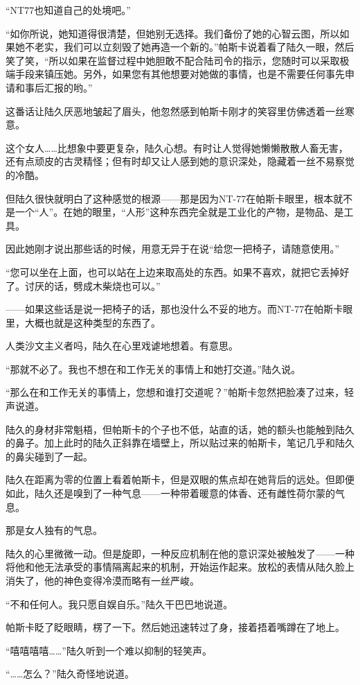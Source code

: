 “NT77也知道自己的处境吧。”

“如你所说，她知道得很清楚，但她别无选择。我们备份了她的心智云图，所以如果她不老实，我们可以立刻毁了她再造一个新的。”帕斯卡说着看了陆久一眼，然后笑了笑，“所以如果在监督过程中她胆敢不配合陆司令的指示，您随时可以采取极端手段来镇压她。另外，如果您有其他想要对她做的事情，也是不需要任何事先申请和事后汇报的哟。”

这番话让陆久厌恶地皱起了眉头，他忽然感到帕斯卡刚才的笑容里仿佛透着一丝寒意。

这个女人……比想象中要更复杂，陆久心想。有时让人觉得她懒懒散散人畜无害，还有点顽皮的古灵精怪；但有时却又让人感到她的意识深处，隐藏着一丝不易察觉的冷酷。

但陆久很快就明白了这种感觉的根源——那是因为NT-77在帕斯卡眼里，根本就不是一个“人”。在她的眼里，“人形”这种东西完全就是工业化的产物，是物品、是工具。

因此她刚才说出那些话的时候，用意无异于在说“给您一把椅子，请随意使用。”

“您可以坐在上面，也可以站在上边来取高处的东西。如果不喜欢，就把它丢掉好了。讨厌的话，劈成木柴烧也可以。”

——如果这些话是说一把椅子的话，那也没什么不妥的地方。而NT-77在帕斯卡眼里，大概也就是这种类型的东西了。

人类沙文主义者吗，陆久在心里戏谑地想着。有意思。

“那就不必了。我也不想在和工作无关的事情上和她打交道。”陆久说。

“那么在和工作无关的事情上，您想和谁打交道呢？”帕斯卡忽然把脸凑了过来，轻声说道。

陆久的身材非常魁梧，但帕斯卡的个子也不低，站直的话，她的额头也能触到陆久的鼻子。加上此时的陆久正斜靠在墙壁上，所以贴过来的帕斯卡，笔记几乎和陆久的鼻尖碰到了一起。

陆久在距离为零的位置上看着帕斯卡，但是双眼的焦点却在她背后的远处。但即便如此，陆久还是嗅到了一种气息——一种带着暖意的体香、还有雌性荷尔蒙的气息。

那是女人独有的气息。

陆久的心里微微一动。但是旋即，一种反应机制在他的意识深处被触发了——一种将他和他无法承受的事情隔离起来的机制，开始运作起来。放松的表情从陆久脸上消失了，他的神色变得冷漠而略有一丝严峻。

“不和任何人。我只愿自娱自乐。”陆久干巴巴地说道。

帕斯卡眨了眨眼睛，楞了一下。然后她迅速转过了身，接着捂着嘴蹲在了地上。

“嘻嘻嘻嘻……”陆久听到一个难以抑制的轻笑声。

“……怎么？”陆久奇怪地说道。

